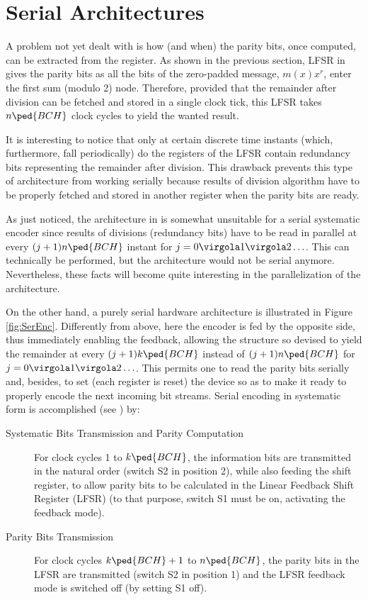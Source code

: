 \section{Serial Architectures} \label{sec:SArch}

A problem not yet dealt with is how (and when) the parity bits, once computed, can be extracted from the register. As shown in the previous section, LFSR in   gives the parity bits as all the bits of the zero-padded message, \(m(x)x^r\), enter the first sum (modulo 2) node. Therefore, provided that the remainder after division can be fetched and stored in a single clock tick, this LFSR takes \(n\ped{BCH}\) clock cycles to yield the wanted result.

It is interesting to notice that only at certain discrete time instants (which, furthermore, fall periodically) do the registers of the LFSR contain redundancy bits representing the remainder after division. This drawback prevents this type of architecture from working serially because results of division algorithm have to be properly fetched and stored in another register when the parity bits are ready.

As just noticed, the architecture in  is somewhat unsuitable for a serial systematic encoder since results of divisions (redundancy bits) have to be read in parallel at every \((j+1) n\ped{BCH}\) instant for \(j= 0 \virgola 1 \virgola 2 \ldots\). This can technically be performed, but the architecture would not be serial anymore. Nevertheless, these facts will become quite interesting in the parallelization of the architecture.

On the other hand, a purely serial hardware architecture is illustrated in Figure \ref{fig:SerEnc}. Differently from above, here the encoder is fed by the opposite side, thus immediately enabling the feedback, allowing the structure so devised to yield the remainder at every $(j+1) k\ped{BCH}$ instead of $(j+1) n\ped{BCH}$ for  \(j= 0 \virgola 1 \virgola 2 \ldots\). This permits one to read the parity bits serially and, besides, to set (each register is reset) the device so as to make it ready to properly encode the next incoming bit streams.
Serial encoding in systematic form is accomplished (see ) by:

\begin{description}
\item[ Systematic Bits Transmission and Parity Computation]
For clock cycles 1 to $k\ped{BCH}$, the information bits are transmitted in the natural order (switch S2 in position 2), while also feeding the shift register, to allow parity bits to be calculated in the Linear Feedback Shift Register (LFSR) (to that purpose, switch S1 must be on, activating the feedback mode).
\item[Parity Bits Transmission]
For clock cycles $k\ped{BCH}+1$ to $n\ped{BCH}$, the parity bits in the LFSR are transmitted (switch S2 in position 1) and the LFSR feedback mode is switched off (by setting S1 off).
\end{description}

